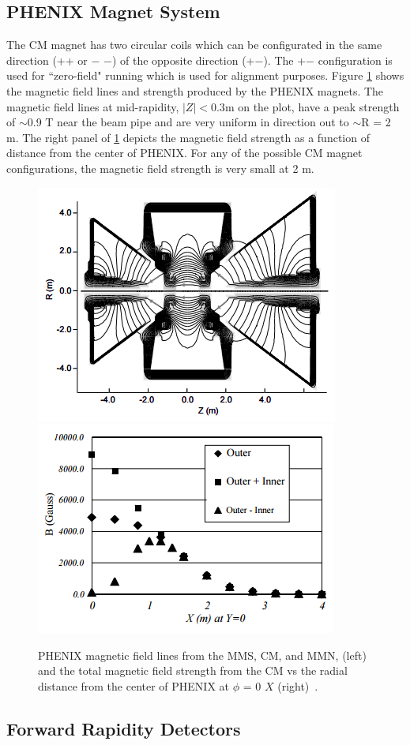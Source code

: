\subsection{PHENIX Magnet System}
 The CM magnet has two circular coils which can be configurated in the same direction (++ or $-$ $-$) of the opposite direction (+$-$). The +$-$ configuration is used for ``zero-field" running which is used for alignment purposes. Figure \ref{fig:magnet_figures} shows the magnetic field lines and strength produced by the PHENIX magnets. The magnetic field lines at mid-rapidity, $|Z| < 0.3$m on the plot, have a peak strength of $\sim$0.9 T near the beam pipe and are very uniform in direction out to $\sim$R = 2 m. The right panel of \ref{fig:magnet_figures} depicts the magnetic field strength as a function of distance from the center of PHENIX. For any of the possible CM magnet configurations, the magnetic field strength is very small at 2 m.
\begin{figure}[!ht]
\begin{center}
\includegraphics[width=0.45\linewidth]{figs/magnet_map.png}
\includegraphics[width=0.45\linewidth]{figs/magnetic_field_strength.png}
\caption{PHENIX magnetic field lines from the MMS, CM, and MMN, (left) and the total magnetic field strength from the CM vs the radial distance from the center of PHENIX at $\phi$ = 0 $X$ (right)~\cite{Aronson2003480}.}
\label{fig:magnet_figures}
\end{center}
\end{figure}
\subsection{Forward Rapidity Detectors}
